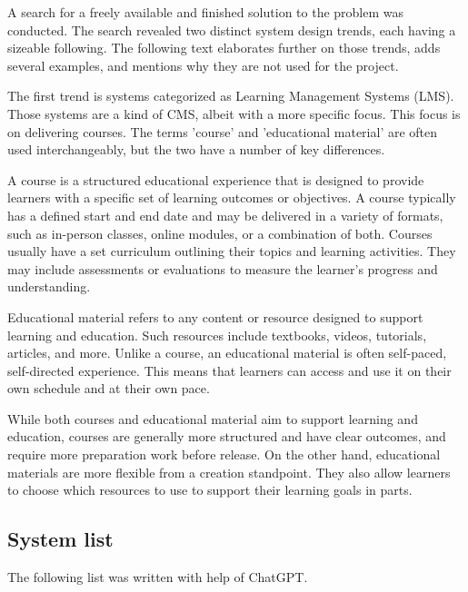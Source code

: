 \documentclass[
  digital,     %
  oneside,     %
  nosansbold,  %
  colorbold, %
  lof,         %
  lot,         %
]{fithesis4}
\begin{document}
A search for a freely available and finished solution to the problem was conducted. The search revealed two distinct system design trends, each having a sizeable following. The following text elaborates further on those trends, adds several examples, and mentions why they are not used for the project.

The first trend is systems categorized as Learning Management Systems (LMS). Those systems are a kind of CMS, albeit with a more specific focus. This focus is on delivering courses. The terms 'course' and 'educational material' are often used interchangeably, but the two have a number of key differences.

A course is a structured educational experience that is designed to provide learners with a specific set of learning outcomes or objectives. A course typically has a defined start and end date and may be delivered in a variety of formats, such as in-person classes, online modules, or a combination of both. Courses usually have a set curriculum outlining their topics and learning activities. They may include assessments or evaluations to measure the learner's progress and understanding.

Educational material refers to any content or resource designed to support learning and education. Such resources include textbooks, videos, tutorials, articles, and more. Unlike a course, an educational material is often self-paced, self-directed experience. This means that learners can access and use it on their own schedule and at their own pace.

While both courses and educational material aim to support learning and education, courses are generally more structured and have clear outcomes, and require more preparation work before release. On the other hand, educational materials are more flexible from a creation standpoint. They also allow learners to choose which resources to use to support their learning goals in parts.

\subsection{System list}

The following list was written with help of ChatGPT.
\end{document}
